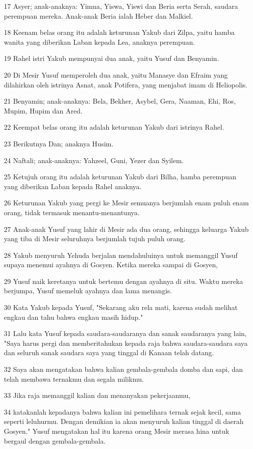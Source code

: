 \par 17 Asyer; anak-anaknya: Yimna, Yiswa, Yiswi dan Beria serta Serah, saudara perempuan mereka. Anak-anak Beria ialah Heber dan Malkiel.
\par 18 Keenam belas orang itu adalah keturunan Yakub dari Zilpa, yaitu hamba wanita yang diberikan Laban kepada Lea, anaknya perempuan.
\par 19 Rahel istri Yakub mempunyai dua anak, yaitu Yusuf dan Benyamin.
\par 20 Di Mesir Yusuf memperoleh dua anak, yaitu Manasye dan Efraim yang dilahirkan oleh istrinya Asnat, anak Potifera, yang menjabat imam di Heliopolis.
\par 21 Benyamin; anak-anaknya: Bela, Bekher, Asybel, Gera, Naaman, Ehi, Ros, Mupim, Hupim dan Ared.
\par 22 Keempat belas orang itu adalah keturunan Yakub dari istrinya Rahel.
\par 23 Berikutnya Dan; anaknya Husim.
\par 24 Naftali; anak-anaknya: Yahzeel, Guni, Yezer dan Syilem.
\par 25 Ketujuh orang itu adalah keturunan Yakub dari Bilha, hamba perempuan yang diberikan Laban kepada Rahel anaknya.
\par 26 Keturunan Yakub yang pergi ke Mesir semuanya berjumlah enam puluh enam orang, tidak termasuk menantu-menantunya.
\par 27 Anak-anak Yusuf yang lahir di Mesir ada dua orang, sehingga keluarga Yakub yang tiba di Mesir seluruhnya berjumlah tujuh puluh orang.
\par 28 Yakub menyuruh Yehuda berjalan mendahuluinya untuk memanggil Yusuf supaya menemui ayahnya di Gosyen. Ketika mereka sampai di Gosyen,
\par 29 Yusuf naik keretanya untuk bertemu dengan ayahnya di situ. Waktu mereka berjumpa, Yusuf memeluk ayahnya dan lama menangis.
\par 30 Kata Yakub kepada Yusuf, "Sekarang aku rela mati, karena sudah melihat engkau dan tahu bahwa engkau masih hidup."
\par 31 Lalu kata Yusuf kepada saudara-saudaranya dan sanak saudaranya yang lain, "Saya harus pergi dan memberitahukan kepada raja bahwa saudara-saudara saya dan seluruh sanak saudara saya yang tinggal di Kanaan telah datang.
\par 32 Saya akan mengatakan bahwa kalian gembala-gembala domba dan sapi, dan telah membawa ternakmu dan segala milikmu.
\par 33 Jika raja memanggil kalian dan menanyakan pekerjaanmu,
\par 34 katakanlah kepadanya bahwa kalian ini pemelihara ternak sejak kecil, sama seperti leluhurmu. Dengan demikian ia akan menyuruh kalian tinggal di daerah Gosyen." Yusuf mengatakan hal itu karena orang Mesir merasa hina untuk bergaul dengan gembala-gembala.

